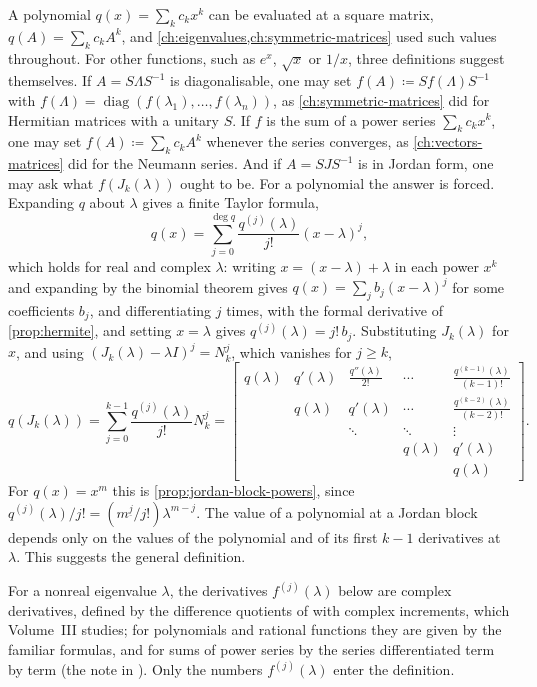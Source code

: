 A polynomial $q(x)=\sum_kc_kx^k$ can be evaluated at a square matrix, $q(A)=\sum_kc_kA^k$, and \cref{ch:eigenvalues,ch:symmetric-matrices} used such values throughout. For other functions, such as $e^x$, $\sqrt x$ or $1/x$, three definitions suggest themselves. If $A=S\Lambda S^{-1}$ is diagonalisable, one may set $f(A)\coloneqq Sf(\Lambda)S^{-1}$ with $f(\Lambda)=\operatorname{diag}(f(\lambda_1),\ldots,f(\lambda_n))$, as \cref{ch:symmetric-matrices} did for Hermitian matrices with a unitary $S$. If $f$ is the sum of a power series $\sum_kc_kx^k$, one may set $f(A)\coloneqq\sum_kc_kA^k$ whenever the series converges, as \cref{ch:vectors-matrices} did for the Neumann series. And if $A=SJS^{-1}$ is in Jordan form, one may ask what $f(J_k(\lambda))$ ought to be. For a polynomial the answer is forced. Expanding $q$ about $\lambda$ gives a finite Taylor formula,
\begin{equation}
q(x)=\sum_{j=0}^{\deg q}\frac{q^{(j)}(\lambda)}{j!}(x-\lambda)^j ,
\label{eq:polynomial-taylor}
\end{equation}
which holds for real and complex $\lambda$: writing $x=(x-\lambda)+\lambda$ in each power $x^k$ and expanding by the binomial theorem gives $q(x)=\sum_jb_j(x-\lambda)^j$ for some coefficients $b_j$, and differentiating $j$ times, with the formal derivative of \cref{prop:hermite}, and setting $x=\lambda$ gives $q^{(j)}(\lambda)=j!\,b_j$. Substituting $J_k(\lambda)$ for $x$, and using $(J_k(\lambda)-\lambda I)^j=N_k^j$, which vanishes for $j\ge k$,
\begin{equation}
q(J_k(\lambda))=\sum_{j=0}^{k-1}\frac{q^{(j)}(\lambda)}{j!}N_k^j=\begin{bmatrix}q(\lambda)&q'(\lambda)&\frac{q''(\lambda)}{2!}&\cdots&\frac{q^{(k-1)}(\lambda)}{(k-1)!}\\&q(\lambda)&q'(\lambda)&\cdots&\frac{q^{(k-2)}(\lambda)}{(k-2)!}\\&&\ddots&\ddots&\vdots\\&&&q(\lambda)&q'(\lambda)\\&&&&q(\lambda)\end{bmatrix}.
\label{eq:polynomial-jordan}
\end{equation}
For $q(x)=x^m$ this is \cref{prop:jordan-block-powers}, since $q^{(j)}(\lambda)/j!=(m^{\underline j}/j!)\lambda^{m-j}$. The value of a polynomial at a Jordan block depends only on the values of the polynomial and of its first $k-1$ derivatives at $\lambda$. This suggests the general definition.

For a nonreal eigenvalue $\lambda$, the derivatives $f^{(j)}(\lambda)$ below are complex derivatives, defined by the difference quotients of  with complex increments, which Volume~III studies; for polynomials and rational functions they are given by the familiar formulas, and for sums of power series by the series differentiated term by term (the note in ). Only the numbers $f^{(j)}(\lambda)$ enter the definition.

